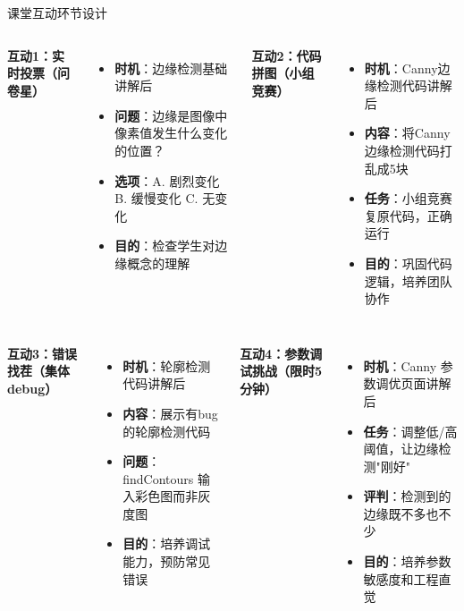 \begin{frame}{课堂互动环节设计}
    \begin{columns}
        \textbf{互动1：实时投票（问卷星）}
        \begin{itemize}\itemsep=0pt
            \item \textbf{时机}：边缘检测基础讲解后
            \item \textbf{问题}：边缘是图像中像素值发生什么变化的位置？
            \item \textbf{选项}：A. 剧烈变化  B. 缓慢变化  C. 无变化
            \item \textbf{目的}：检查学生对边缘概念的理解
        \end{itemize}

        \textbf{互动2：代码拼图（小组竞赛）}
        \begin{itemize}\itemsep=0pt
            \item \textbf{时机}：Canny边缘检测代码讲解后
            \item \textbf{内容}：将Canny边缘检测代码打乱成5块
            \item \textbf{任务}：小组竞赛复原代码，正确运行
            \item \textbf{目的}：巩固代码逻辑，培养团队协作
        \end{itemize}
    \end{columns}

    \begin{columns}
        \textbf{互动3：错误找茬（集体debug）}
        \begin{itemize}\itemsep=0pt
            \item \textbf{时机}：轮廓检测代码讲解后
            \item \textbf{内容}：展示有bug的轮廓检测代码
            \item \textbf{问题}：findContours 输入彩色图而非灰度图
            \item \textbf{目的}：培养调试能力，预防常见错误
        \end{itemize}

        \textbf{互动4：参数调试挑战（限时5分钟）}
        \begin{itemize}\itemsep=0pt
            \item \textbf{时机}：Canny 参数调优页面讲解后
            \item \textbf{任务}：调整低/高阈值，让边缘检测"刚好"
            \item \textbf{评判}：检测到的边缘既不多也不少
            \item \textbf{目的}：培养参数敏感度和工程直觉
        \end{itemize}
    \end{columns}
\end{frame}
